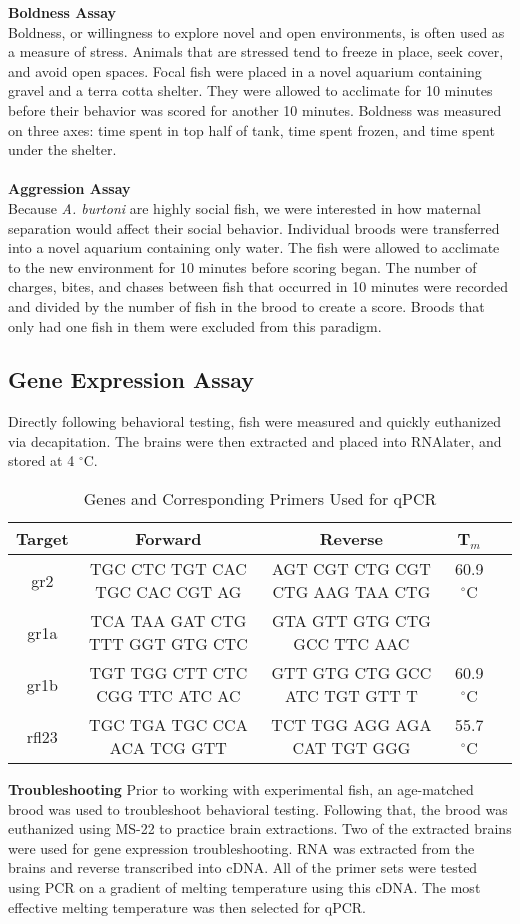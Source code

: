 \documentclass[12pt,twoside]{reedthesis}
\begin{document}
\textbf{Boldness Assay}\\
Boldness, or willingness to explore novel and open environments, is often used as a measure of stress. Animals that are stressed tend to freeze in place, seek cover, and avoid open spaces. Focal fish were placed in a novel aquarium containing gravel and a terra cotta shelter. They were allowed to acclimate for 10 minutes before their behavior was scored for another 10 minutes. Boldness was measured on three axes: time spent in top half of tank, time spent frozen, and time spent under the shelter. \\
\\
\noindent\textbf{Aggression Assay}\\
Because \textit{A. burtoni} are highly social fish, we were interested in how maternal separation would affect their social behavior. Individual broods were transferred into a novel aquarium containing only water. The fish were allowed to acclimate to the new environment for 10 minutes before scoring began. The number of charges, bites, and chases between fish that occurred in 10 minutes were recorded and divided by the number of fish in the brood to create a score. Broods that only had one fish in them were excluded from this paradigm.  


\subsection{Gene Expression Assay}
Directly following behavioral testing, fish were measured and quickly euthanized
via decapitation. The brains were then extracted and placed into RNAlater, and
stored at 4 $^\circ$C. 
\begin{table}[htbp]
\caption[Genes and Corresponding Primers Used for qPCR]{Genes and Corresponding
  Primers Used for qPCR}
\begin{center}
\footnotesize
\begin{tabular}{ | c | c | c | c | c |}
\hline
Target & Forward & Reverse & T$_{m}$\\
\hline
gr2 & TGC CTC TGT CAC TGC CAC CGT AG & AGT CGT CTG CGT CTG AAG TAA CTG &  60.9  $^{\circ}$C\\
\hline
gr1a & TCA TAA GAT CTG TTT GGT GTG CTC & GTA GTT GTG CTG GCC TTC AAC &  \\
\hline
gr1b & TGT TGG CTT CTC CGG TTC ATC AC & GTT GTG CTG GCC ATC TGT GTT T &  60.9 $^{\circ}$C\\
\hline
rfl23 & TGC TGA TGC CCA ACA TCG GTT & TCT TGG AGG AGA CAT TGT GGG &  55.7  $^{\circ}$C\\
\hline
\end{tabular}
\end{center}
\end{table}
\textbf{Troubleshooting}
Prior to working with experimental fish, an age-matched brood was used to
troubleshoot behavioral testing. Following that, the brood was euthanized using
MS-22 to practice brain extractions. Two of the extracted brains were used for
gene expression troubleshooting. RNA was extracted from the brains and reverse
transcribed into cDNA. All of the primer sets were tested using PCR on a gradient of
melting temperature using this cDNA. The most effective melting temperature was
then selected for qPCR.
\end{document}
